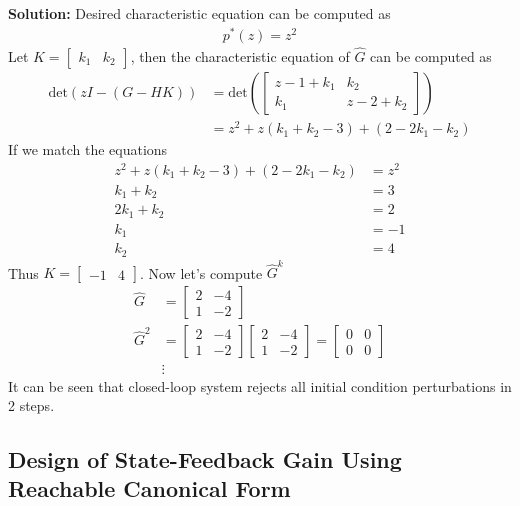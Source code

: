 \documentclass[twoside]{article}
\begin{document}
\textbf{Solution:} Desired characteristic equation can be computed as
%
\begin{align*}
  p^*(z) = z^2
\end{align*}
%
Let $K = \left[ \begin{array}{cc} k_1 & k_2 \end{array} \right]$, then
the characteristic equation of $\hat{G}$ can be computed as
%
\begin{align*}
  \mathrm{det} \left( z I - ( G - H K ) \right) &= 
  \mathrm{det} \left(
  \left[ \begin{array}{cc} z - 1 + k_1 & k_2 \\ k_1 & z - 2 + k_2 \end{array} \right]
  \right)
\\
&= z^2 + z (k_1 + k_2 - 3) + (2 -2 k_1 - k_2)
\end{align*}
%
If we match the equations
%
\begin{align*}
z^2 + z (k_1 + k_2 - 3) + (2 -2 k_1 - k_2) &= z^2
\\
k_1 + k_2 &= 3
\\
2k_1 + k_2 &= 2
\\
k_1 &= -1
\\
k_2 &= 4
\end{align*}
%
Thus $K = \left[ \begin{array}{cc} -1 & 4 \end{array} \right]$.
Now let's compute $\hat{G}^k$ 
%
\begin{align*}
\hat{G} &= \left[ \begin{array}{cc} 2 & -4 \\ 1 & -2 \end{array} \right] 
\\
\hat{G}^2 &= \left[ \begin{array}{cc} 2 & -4 \\ 1 & -2 \end{array} \right] 
\left[ \begin{array}{cc} 2 & -4 \\ 1 & -2 \end{array} \right] = 
\left[ \begin{array}{cc} 0 & 0 \\ 0 & 0 \end{array} \right]
\\
&\vdots
\end{align*}
%
It can be seen that closed-loop system rejects all initial condition
perturbations in 2 steps. 

\subsection*{Design of State-Feedback Gain Using Reachable Canonical
Form}
\end{document}
